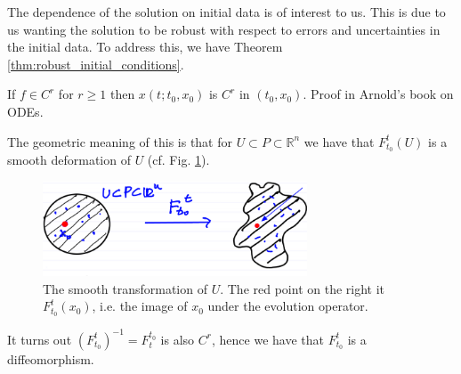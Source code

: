 The dependence of the solution on initial data is of interest to us. This is due to us wanting the solution to be robust with respect to errors and uncertainties in the initial data. To address this, we have Theorem \ref{thm:robust_initial_conditions}.
\begin{theorem}[]
	If $f \in C^r$ for $r\geq 1$ then $ {x}(t; t_0,  {x}_0)$ is $C^r$ in $(t_0,  {x}_0)$. Proof in Arnold's book on ODEs.
	\label{thm:robust_initial_conditions}
\end{theorem}

The geometric meaning of this is that for $U \subset P \subset \mathbb{R}^{n}$ we have that $F_{t_0}^{t}(U)$ is a smooth deformation of $U$ (cf. Fig. \ref{fig:deformation}).
\begin{figure}[h!]
	\centering
	\includegraphics[width=0.7\textwidth]{figures/ch1/7smooth_transform.png}
	\caption{The smooth transformation of $U$. The red point on the right it $F _{t_0}^t( {x}_0)$, i.e. the image of $ {x}_0$ under the evolution operator.}
	\label{fig:deformation}
\end{figure}
It turns out $\left(F_{t_0}^{t}\right)^{-1} = F_{t}^{t_0}$ is also $C^r$, hence we have that $F_{t_0}^{t}$ is a diffeomorphism. 

